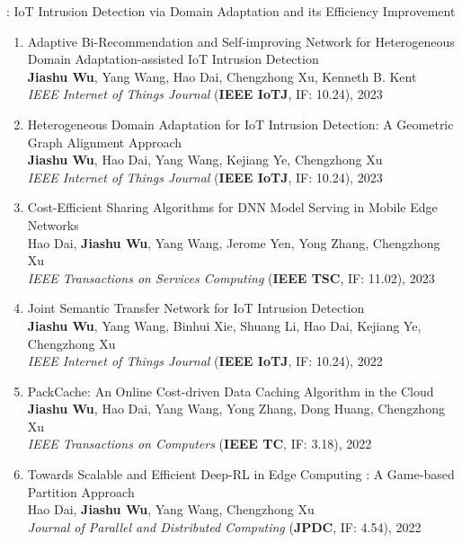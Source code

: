 \documentclass[letterpaper,11pt]{article}
\newcommand{\RNum}[1]{\uppercase\expandafter{\romannumeral #1\relax}}
\begin{document}
\RNum{1}: IoT Intrusion Detection via Domain Adaptation and its Efficiency Improvement
\begin{enumerate}
  \item Adaptive Bi-Recommendation and Self-improving Network for Heterogeneous Domain Adaptation-assisted IoT Intrusion Detection\\
  \textbf{Jiashu Wu}, Yang Wang\textsuperscript{\Letter}, Hao Dai, Chengzhong Xu, Kenneth B. Kent\\
  \textit{IEEE Internet of Things Journal} (\textbf{IEEE IoTJ}, IF: 10.24), 2023

  \item Heterogeneous Domain Adaptation for IoT Intrusion Detection: A Geometric Graph Alignment Approach\\
  \textbf{Jiashu Wu}, Hao Dai, Yang Wang\textsuperscript{\Letter}, Kejiang Ye, Chengzhong Xu\\
  \textit{IEEE Internet of Things Journal} (\textbf{IEEE IoTJ}, IF: 10.24), 2023

  \item Cost-Efficient Sharing Algorithms for DNN Model Serving in Mobile Edge Networks\\
  Hao Dai, \textbf{Jiashu Wu}, Yang Wang\textsuperscript{\Letter}, Jerome Yen, Yong Zhang, Chengzhong Xu\\
  \textit{IEEE Transactions on Services Computing} (\textbf{IEEE TSC}, IF: 11.02), 2023

  \item Joint Semantic Transfer Network for IoT Intrusion Detection\\
  \textbf{Jiashu Wu}, Yang Wang\textsuperscript{\Letter}, Binhui Xie, Shuang Li, Hao Dai, Kejiang Ye, Chengzhong Xu\\
  \textit{IEEE Internet of Things Journal} (\textbf{IEEE IoTJ}, IF: 10.24), 2022

  \item PackCache: An Online Cost-driven Data Caching Algorithm in the Cloud\\
  \textbf{Jiashu Wu}, Hao Dai, Yang Wang\textsuperscript{\Letter}, Yong Zhang, Dong Huang, Chengzhong Xu\\
  \textit{IEEE Transactions on Computers} (\textbf{IEEE TC}, IF: 3.18), 2022

  \item Towards Scalable and Efficient Deep-RL in Edge Computing : A Game-based Partition Approach\\
  Hao Dai, \textbf{Jiashu Wu}, Yang Wang\textsuperscript{\Letter}, Chengzhong Xu\\
  \textit{Journal of Parallel and Distributed Computing} (\textbf{JPDC}, IF: 4.54), 2022


\end{enumerate}
\end{document}
